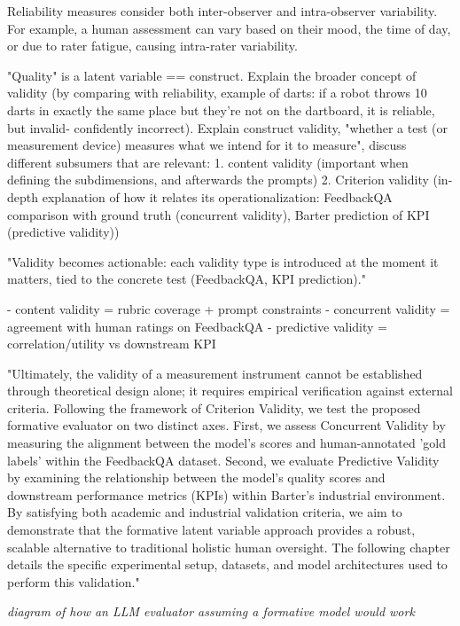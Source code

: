 Reliability measures consider both inter-observer and intra-observer variability. For example, a human assessment can vary based on their mood, the time of day, or due to rater fatigue, causing intra-rater variability. 

"Quality" is a latent variable == construct. Explain the broader concept of validity (by comparing with reliability, example of darts: if a robot throws 10 darts in exactly the same place but they're not on the dartboard, it is reliable, but invalid- confidently incorrect). Explain construct validity, "whether a test (or measurement device) measures what we intend for it to measure", discuss different subsumers that are relevant: 1. content validity (important when defining the subdimensions, and afterwards the prompts) 2. Criterion validity (in-depth explanation of how it relates its operationalization: FeedbackQA comparison with ground truth (concurrent validity), Barter prediction of KPI (predictive validity))


"Validity becomes actionable: each validity type is introduced at the moment it matters, tied to the concrete test (FeedbackQA, KPI prediction)."

- content validity = rubric coverage + prompt constraints
- concurrent validity = agreement with human ratings on FeedbackQA
- predictive validity = correlation/utility vs downstream KPI

"Ultimately, the validity of a measurement instrument cannot be established through theoretical design alone; it requires empirical verification against external criteria. Following the framework of Criterion Validity, we test the proposed formative evaluator on two distinct axes. First, we assess Concurrent Validity by measuring the alignment between the model’s scores and human-annotated 'gold labels' within the FeedbackQA dataset. Second, we evaluate Predictive Validity by examining the relationship between the model's quality scores and downstream performance metrics (KPIs) within Barter’s industrial environment. By satisfying both academic and industrial validation criteria, we aim to demonstrate that the formative latent variable approach provides a robust, scalable alternative to traditional holistic human oversight. The following chapter details the specific experimental setup, datasets, and model architectures used to perform this validation."


\textit{diagram of how an LLM evaluator assuming a formative model would work}